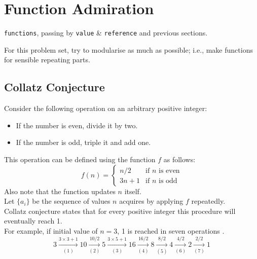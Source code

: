 \section{Function Admiration}
\begin{topics}
\verb!functions!, passing by \verb!value! \& \verb!reference! and previous sections.
\end{topics}
For this problem set, try to modularise as much as possible; i.e., make functions for sensible repeating parts.
\subsection{Collatz Conjecture}
Consider the following operation on an arbitrary positive integer:
\begin{itemize}
	\item If the number is even, divide it by two.
	\item If the number is odd, triple it and add one.
\end{itemize}
This operation can be defined using the function $f$ as follows:
\begin{equation}
f(n) = \begin{cases}
	n/2 & \text{if $n$ is even}\\
	3n+1 & \text{if $n$ is odd}
\end{cases}
\end{equation}
Also note that the function updates $n$ itself.\\
Let $\{a_i\}$ be the sequence of values $n$ acquires by applying $f$ repeatedly.\\
Collatz conjecture states that for every positive integer this procedure will eventually reach 1.\\
For example, if initial value of $n=3$, 1 is reached in seven operations .
\begin{equation*}
3\xrightarrow[(1)]{3\times3+1}10\xrightarrow[(2)]{10/2}5\xrightarrow[(3)]{3\times5+1}16\xrightarrow[(4)]{16/2}8\xrightarrow[(5)]{8/2}4\xrightarrow[(6)]{4/2}2\xrightarrow[(7)]{2/2}1
\end{equation*}
